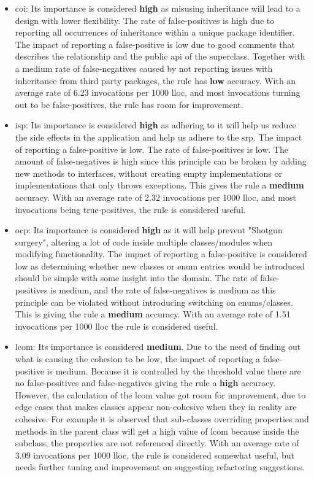 \documentclass{report}
\begin{document}
\begin{itemize}

    \item \gls{coi}: Its importance is considered \textbf{high} as misusing inheritance will lead to a design with lower flexibility. The rate of false-positives is high due to reporting all occurrences of inheritance within a unique package identifier. The impact of reporting a false-positive is low due to good comments that describes the relationship and the public \gls{api} of the superclass. Together with a medium rate of false-negatives caused by not reporting issues with inheritance from third party packages, the rule has \textbf{low} accuracy. With an average rate of 6.23 invocations per 1000 \gls{lloc}, and most invocations turning out to be false-positives, the rule has room for improvement. 

    \item \gls{isp}: Its importance is considered \textbf{high} as adhering to it will help us reduce the side effects in the application and help us adhere to the \gls{srp}. The impact of reporting a false-positive is low. The rate of false-positives is low. The amount of false-negatives is high since this principle can be broken by adding new methods to interfaces, without creating empty implementations or implementations that only throws exceptions. This gives the rule a \textbf{medium} accuracy. With an average rate of 2.32 invocations per 1000 \gls{lloc}, and most invocations being true-positives, the rule is considered useful.
    
    \item \gls{ocp}: Its importance is considered \textbf{high} as it will help prevent "Shotgun surgery", altering a lot of code inside multiple classes/modules when modifying functionality. The impact of reporting a false-positive is considered low as determining whether new classes or enum entries would be introduced should be simple with some insight into the domain. The rate of false-positives is medium, and the rate of false-negatives is medium as this principle can be violated without introducing switching on enums/classes. This is giving the rule a \textbf{medium} accuracy. With an average rate of 1.51 invocations per 1000 \gls{lloc} the rule is considered useful.
    
    \item \gls{lcom}: Its importance is considered \textbf{medium}. Due to the need of finding out what is causing the cohesion to be low, the impact of reporting a false-positive is medium. Because it is controlled by the threshold value there are no false-positives and false-negatives giving the rule a \textbf{high} accuracy. However, the calculation of the \gls{lcom} value got room for improvement, due to edge cases that makes classes appear non-cohesive when they in reality are cohesive. For example it is observed that sub-classes overriding properties and methods in the parent class will get a high value of \gls{lcom} because inside the subclass, the properties are not referenced directly. With an average rate of 3.09 invocations per 1000 \gls{lloc}, the rule is considered somewhat useful, but needs further tuning and improvement on suggesting refactoring suggestions. 


\end{itemize}
\end{document}
